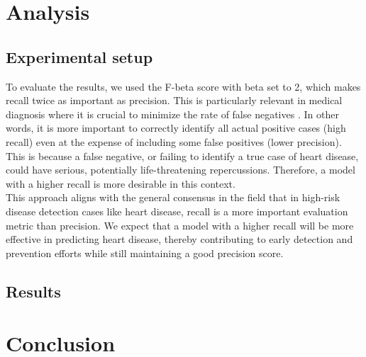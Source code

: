 \documentclass[letterpaper]{article}
\begin{document}
\section{Analysis}

\subsection{Experimental setup}
To evaluate the results, we used the F-beta score with beta set to 2, which makes recall twice as important as precision. This is particularly relevant in medical diagnosis where it is crucial to minimize the rate of false negatives \cite{9418099}. In other words, it is more important to correctly identify all actual positive cases (high recall) even at the expense of including some false positives (lower precision). This is because a false negative, or failing to identify a true case of heart disease, could have serious, potentially life-threatening repercussions. Therefore, a model with a higher recall is more desirable in this context.\\
This approach aligns with the general consensus in the field that in high-risk disease detection cases like heart disease, recall is a more important evaluation metric than precision. We expect that a model with a higher recall will be more effective in predicting heart disease, thereby contributing to early detection and prevention efforts while still maintaining a good precision score.

\subsection{Results}


\section{Conclusion}
\end{document}
